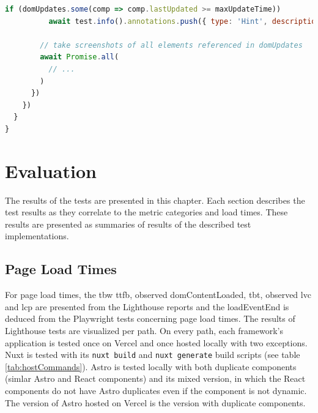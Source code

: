 \documentclass[a4paper, 10pt]{article}
\begin{document}
\begin{lstlisting}[caption={Test file for component update times}, label={lst:state-change-spec}, language=JavaScript]
        if (domUpdates.some(comp => comp.lastUpdated >= maxUpdateTime))
          await test.info().annotations.push({ type: 'Hint', description: `Screenshots below show slow updating components` });

        // take screenshots of all elements referenced in domUpdates
        await Promise.all(
          // ...
        )
      })
    })
  }
}
\end{lstlisting}
  
\section{Evaluation}\label{sec:evaluation}

The results of the tests are presented in this chapter.
Each section describes the test results as they correlate to the metric categories and load times.
These results are presented as summaries of results of the described test implementations.

\subsection{Page Load Times}\label{subsec:pageloadtimes}

For page load times, the \acrshort{tbw} \acrshort{ttfb}, observed domContentLoaded, \acrshort{tbt}, observed \acrshort{lvc} and \acrshort{lcp} are presented from the Lighthouse reports and the loadEventEnd is deduced from the Playwright tests concerning page load times.
The results of Lighthouse tests are visualized per path.
On every path, each framework's application is tested once on Vercel and once hosted locally with two exceptions.
Nuxt is tested with its \verb|nuxt build| and \verb|nuxt generate| build scripts (see table \ref{tab:hostCommands}).
Astro is tested locally with both duplicate components (simlar Astro and React components) and its mixed version, in which the React components do not have Astro duplicates even if the component is not dynamic.
The version of Astro hosted on Vercel is the version with duplicate components.
\end{document}
